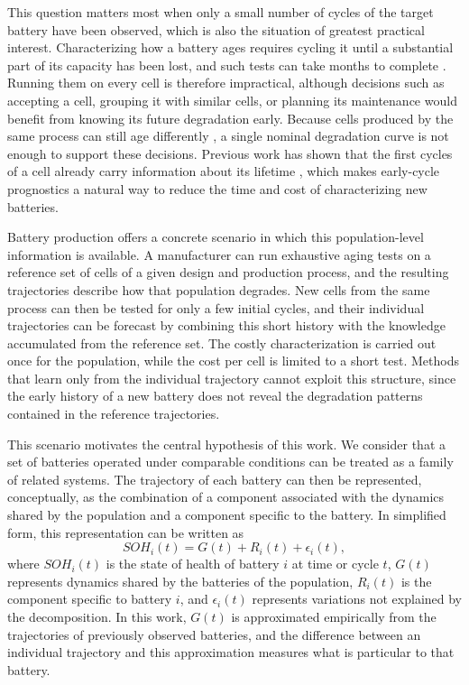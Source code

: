 \documentclass[conference]{IEEEtran}
\begin{document}
This question matters most when only a small number of cycles of the target battery have been observed, which is also the situation of greatest practical interest. Characterizing how a battery ages requires cycling it until a substantial part of its capacity has been lost, and such tests can take months to complete \cite{severson2019data, attia2020closed}. Running them on every cell is therefore impractical, although decisions such as accepting a cell, grouping it with similar cells, or planning its maintenance would benefit from knowing its future degradation early. Because cells produced by the same process can still age differently \cite{baumhofer2014production}, a single nominal degradation curve is not enough to support these decisions. Previous work has shown that the first cycles of a cell already carry information about its lifetime \cite{severson2019data}, which makes early-cycle prognostics a natural way to reduce the time and cost of characterizing new batteries.

Battery production offers a concrete scenario in which this population-level information is available. A manufacturer can run exhaustive aging tests on a reference set of cells of a given design and production process, and the resulting trajectories describe how that population degrades. New cells from the same process can then be tested for only a few initial cycles, and their individual trajectories can be forecast by combining this short history with the knowledge accumulated from the reference set. The costly characterization is carried out once for the population, while the cost per cell is limited to a short test. Methods that learn only from the individual trajectory cannot exploit this structure, since the early history of a new battery does not reveal the degradation patterns contained in the reference trajectories.

This scenario motivates the central hypothesis of this work. We consider that a set of batteries operated under comparable conditions can be treated as a family of related systems. The trajectory of each battery can then be represented, conceptually, as the combination of a component associated with the dynamics shared by the population and a component specific to the battery. In simplified form, this representation can be written as
\begin{equation}
    SOH_i(t) = G(t) + R_i(t) + \epsilon_i(t),
    \label{eq:decomposicao_soh_intro}
\end{equation}
where $SOH_i(t)$ is the state of health of battery $i$ at time or cycle $t$, $G(t)$ represents dynamics shared by the batteries of the population, $R_i(t)$ is the component specific to battery $i$, and $\epsilon_i(t)$ represents variations not explained by the decomposition. In this work, $G(t)$ is approximated empirically from the trajectories of previously observed batteries, and the difference between an individual trajectory and this approximation measures what is particular to that battery.
\end{document}
